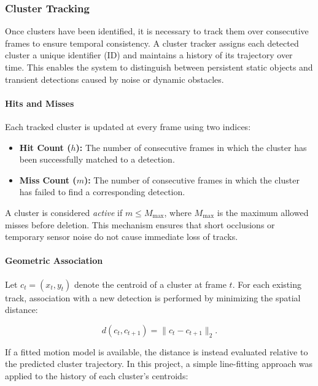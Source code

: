 \subsubsection{Cluster Tracking}
\label{subsec:cluster_tracking}

Once clusters have been identified, it is necessary to track them over consecutive frames to ensure temporal consistency. 
A cluster tracker assigns each detected cluster a unique identifier (ID) and maintains a history of its trajectory over time. 
This enables the system to distinguish between persistent static objects and transient detections caused by noise or dynamic obstacles.

\paragraph{Hits and Misses}
Each tracked cluster is updated at every frame using two indices: 
\begin{itemize}
    \item \textbf{Hit Count ($h$):} The number of consecutive frames in which the cluster has been successfully matched to a detection.
    \item \textbf{Miss Count ($m$):} The number of consecutive frames in which the cluster has failed to find a corresponding detection.
\end{itemize}

A cluster is considered \textit{active} if $m \leq M_{\text{max}}$, where $M_{\text{max}}$ is the maximum allowed misses before deletion. 
This mechanism ensures that short occlusions or temporary sensor noise do not cause immediate loss of tracks.

\paragraph{Geometric Association}
Let $c_t = (x_t, y_t)$ denote the centroid of a cluster at frame $t$.  
For each existing track, association with a new detection is performed by minimizing the spatial distance:

\begin{equation}
    d(c_t, c_{t+1}) = \lVert c_t - c_{t+1} \rVert_2.
\end{equation}

If a fitted motion model is available, the distance is instead evaluated relative to the predicted cluster trajectory. 
In this project, a simple line-fitting approach was applied to the history of each cluster’s centroids:

